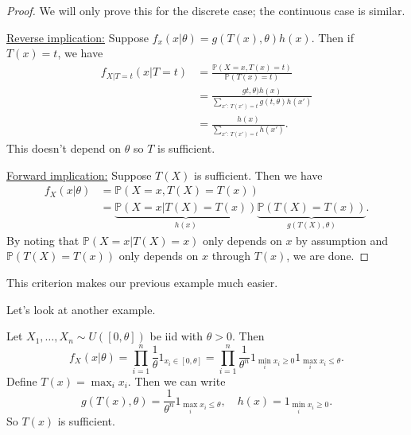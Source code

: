 \documentclass[a4paper]{scrartcl}
\begin{document}
\begin{proof}
      We will only prove this for the discrete case; the continuous case is similar. 
      
      \underline{Reverse implication:} Suppose $f_{x}(x| \theta)=g (T (x), \theta)h (x)$. Then if $T (x)=t$, we have 
      \begin{align*}
           f_{X|T=t} (x|T=t)&= \frac{\mathbb{P}(X=x,T (x)=t)}{\mathbb{P}(T (x)=t)}\\
           &= \frac{g t, \theta)h (x)}{\sum_{x': \ T (x')=t}^{}g (t, \theta)h (x')}\\
           &=\frac{h (x)}{\sum_{x': \ T (x')=t}^{}h (x')}.
      \end{align*}
      This doesn't depend on $\theta$ so $T$ is sufficient.

      \underline{Forward implication:} Suppose $T (X)$ is sufficient. Then we have 
      \begin{align*}
           f_X (x| \theta)&=\mathbb{P} (X=x, T (X)=T (x))\\
           &=\underbrace{\mathbb{P}(X=x| T (X)=T (x))}_{h (x)} \underbrace{\mathbb{P}(T(X)=T (x))}_{g (T (X),\theta)}.
      \end{align*}
      By noting that $\mathbb{P}(X=x| T (X)=x)$ only depends on $x$ by assumption and $\mathbb{P}(T(X)=T (x))$ only depends on $x$ through $T (x)$, we are done.
\end{proof}
\begin{remark}
      This criterion makes our previous example much easier.
\end{remark}
Let's look at another example.
\begin{example*}
      Let $X_1 , \ldots ,X_n \sim U ([0, \theta])$ be iid with $\theta >0$. Then \[
      f_{X}(x| \theta)=\prod_{i=1}^{n}\frac{1}{\theta} 1_{x_{i} \in [0, \theta]}=\prod_{i=1}^{n}\frac{1}{\theta^{n}} 1_{\min_i x_{i} \geq 0} 1_{\max_i x_{i} \leq \theta} 
      .\] Define $T (x)=\max_i x_i$. Then we can write \[
      g (T (x), \theta)=\frac{1}{\theta^{n}}1_{\max_i x_{i} \leq \theta} , \quad h (x)=1_{\min_i x_{i} \geq 0}
      .\] So $T (x)$ is sufficient.
\end{example*}
\end{document}
